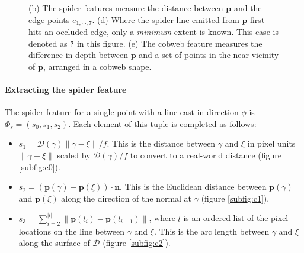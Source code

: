 \documentclass[10pt,twocolumn,letterpaper]{article}
\newcommand{\rgbdimage}{\mathcal{D}}
\newcommand{\pixelidx}{\gamma}
\newcommand{\edgeimidx}{\xi}
\newcommand{\project}{\mathbf{p}}
\newcommand{\point}{\mathbf{p}}
\newcommand{\normal}{\mathbf{n}}
\begin{document}
\begin{figure}[tb]
        \hfill
    \caption{
    (b) The spider features measure the distance between $\point$ and the edge points $e_{1, \cdots, 7}$.
    (d) Where the spider line emitted from $\point$ first hits an occluded edge, only a \textit{minimum} extent is known.
    This case is denoted as \texttt{?} in this figure.
    (e) The cobweb feature measures the difference in depth between $\point$ and a set of points in the near vicinity of $\point$, arranged in a cobweb shape.}%
    \label{fig:features}
\end{figure}



\paragraph{Extracting the spider feature}

\newcommand{\spiderfeat}{s}

The spider feature for a single point with a line cast in direction $\phi$ is $\Phi_s = (\spiderfeat_0, \spiderfeat_1, \spiderfeat_2)$.
Each element of this tuple is completed as follows:
\begin{itemize}

\item $\spiderfeat_1 = \rgbdimage(\pixelidx) \|\pixelidx - \edgeimidx\| / f$. This is the distance between $\pixelidx$ and $\edgeimidx$ in pixel units $\|\pixelidx - \edgeimidx\|$ scaled by $\rgbdimage(\pixelidx) / f$ to convert to a real-world distance (figure \ref{subfig:c0}).

\item $\spiderfeat_2 = (\point(\pixelidx) - \point(\edgeimidx)) \cdot \normal$. 
This is the Euclidean distance between $\point(\pixelidx)$ and $\point(\edgeimidx)$ along the direction of the normal at $\pixelidx$  (figure \ref{subfig:c1}).

\item $\spiderfeat_3 = \sum_{i=2}^{|l|} \| \project(l_i) - \project(l_{i-1}) \| $, where $l$ is an ordered list of the pixel locations on the line between $\pixelidx$ and $\edgeimidx$.
This is the arc length between $\pixelidx$ and $\edgeimidx$ along the surface of $\rgbdimage$  (figure \ref{subfig:c2}).
\end{itemize}
\end{document}
